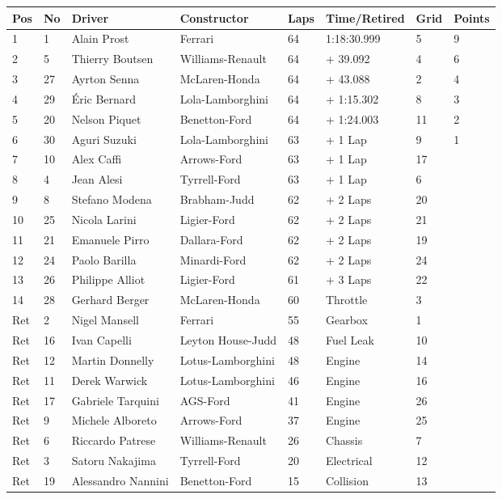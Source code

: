 \documentclass{article}
\begin{document}
\begin{tabular}{llllllll}
\toprule
Pos & No & Driver & Constructor & Laps & Time/Retired & Grid & Points \\
\midrule
1 & 1 & Alain Prost & Ferrari & 64 & 1:18:30.999 & 5 & 9 \\
2 & 5 & Thierry Boutsen & Williams-Renault & 64 & + 39.092 & 4 & 6 \\
3 & 27 & Ayrton Senna & McLaren-Honda & 64 & + 43.088 & 2 & 4 \\
4 & 29 & Éric Bernard & Lola-Lamborghini & 64 & + 1:15.302 & 8 & 3 \\
5 & 20 & Nelson Piquet & Benetton-Ford & 64 & + 1:24.003 & 11 & 2 \\
6 & 30 & Aguri Suzuki & Lola-Lamborghini & 63 & + 1 Lap & 9 & 1 \\
7 & 10 & Alex Caffi & Arrows-Ford & 63 & + 1 Lap & 17 &  \\
8 & 4 & Jean Alesi & Tyrrell-Ford & 63 & + 1 Lap & 6 &  \\
9 & 8 & Stefano Modena & Brabham-Judd & 62 & + 2 Laps & 20 &  \\
10 & 25 & Nicola Larini & Ligier-Ford & 62 & + 2 Laps & 21 &  \\
11 & 21 & Emanuele Pirro & Dallara-Ford & 62 & + 2 Laps & 19 &  \\
12 & 24 & Paolo Barilla & Minardi-Ford & 62 & + 2 Laps & 24 &  \\
13 & 26 & Philippe Alliot & Ligier-Ford & 61 & + 3 Laps & 22 &  \\
14 & 28 & Gerhard Berger & McLaren-Honda & 60 & Throttle & 3 &  \\
Ret & 2 & Nigel Mansell & Ferrari & 55 & Gearbox & 1 &  \\
Ret & 16 & Ivan Capelli & Leyton House-Judd & 48 & Fuel Leak & 10 &  \\
Ret & 12 & Martin Donnelly & Lotus-Lamborghini & 48 & Engine & 14 &  \\
Ret & 11 & Derek Warwick & Lotus-Lamborghini & 46 & Engine & 16 &  \\
Ret & 17 & Gabriele Tarquini & AGS-Ford & 41 & Engine & 26 &  \\
Ret & 9 & Michele Alboreto & Arrows-Ford & 37 & Engine & 25 &  \\
Ret & 6 & Riccardo Patrese & Williams-Renault & 26 & Chassis & 7 &  \\
Ret & 3 & Satoru Nakajima & Tyrrell-Ford & 20 & Electrical & 12 &  \\
Ret & 19 & Alessandro Nannini & Benetton-Ford & 15 & Collision & 13 &  \\

\end{tabular}
\end{document}
